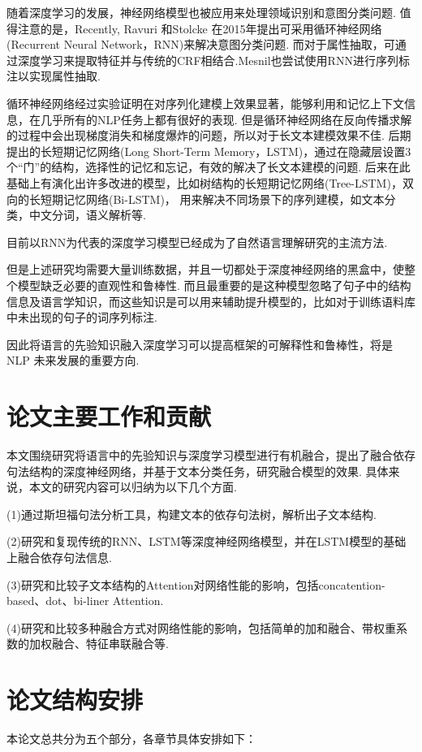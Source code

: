 \documentclass[bachelor,winfonts]{jnuthesis}
\begin{document}
随着深度学习的发展，神经网络模型也被应用来处理领域识别和意图分类问题.
值得注意的是，Recently, Ravuri 和Stolcke 在2015年提出可采用循环神经网络(Recurrent Neural Network，RNN)来解决意图分类问题.
而对于属性抽取，可通过深度学习来提取特征并与传统的CRF相结合.Mesnil也尝试使用RNN进行序列标注以实现属性抽取.

循环神经网络经过实验证明在对序列化建模上效果显著，能够利用和记忆上下文信息，在几乎所有的NLP任务上都有很好的表现.
但是循环神经网络在反向传播求解的过程中会出现梯度消失和梯度爆炸的问题，所以对于长文本建模效果不佳.
后期提出的长短期记忆网络(Long Short-Term Memory，LSTM)，通过在隐藏层设置3个“门”的结构，选择性的记忆和忘记，有效的解决了长文本建模的问题.
后来在此基础上有演化出许多改进的模型，比如树结构的长短期记忆网络(Tree-LSTM)，双向的长短期记忆网络(Bi-LSTM)，
用来解决不同场景下的序列建模，如文本分类，中文分词，语义解析等.

目前以RNN为代表的深度学习模型已经成为了自然语言理解研究的主流方法.

但是上述研究均需要大量训练数据，并且一切都处于深度神经网络的黑盒中，使整个模型缺乏必要的直观性和鲁棒性.
而且最重要的是这种模型忽略了句子中的结构信息及语言学知识，而这些知识是可以用来辅助提升模型的，比如对于训练语料库中未出现的句子的词序列标注.

因此将语言的先验知识融入深度学习可以提高框架的可解释性和鲁棒性，将是 NLP 未来发展的重要方向.



\section{论文主要工作和贡献}
本文围绕研究将语言中的先验知识与深度学习模型进行有机融合，提出了融合依存句法结构的深度神经网络，并基于文本分类任务，研究融合模型的效果.
具体来说，本文的研究内容可以归纳为以下几个方面.

(1)通过斯坦福句法分析工具，构建文本的依存句法树，解析出子文本结构.

(2)研究和复现传统的RNN、LSTM等深度神经网络模型，并在LSTM模型的基础上融合依存句法信息.

(3)研究和比较子文本结构的Attention对网络性能的影响，包括concatention-based、dot、bi-liner Attention.

(4)研究和比较多种融合方式对网络性能的影响，包括简单的加和融合、带权重系数的加权融合、特征串联融合等.


\section{论文结构安排}
本论文总共分为五个部分，各章节具体安排如下：
\end{document}
